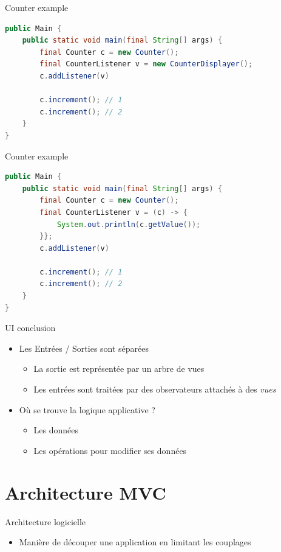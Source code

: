 \documentclass[xcolor=table]{beamer}
\begin{document}
\begin{frame}[fragile]{Counter example}
\begin{lstlisting}[language=Java]
public Main {
    public static void main(final String[] args) {
        final Counter c = new Counter();
        final CounterListener v = new CounterDisplayer();
        c.addListener(v)
        
        c.increment(); // 1
        c.increment(); // 2
    }
}
\end{lstlisting}
\end{frame}

\begin{frame}[fragile]{Counter example}
\begin{lstlisting}[language=Java]
public Main {
    public static void main(final String[] args) {
        final Counter c = new Counter();
        final CounterListener v = (c) -> {
            System.out.println(c.getValue());
        }};
        c.addListener(v)
        
        c.increment(); // 1
        c.increment(); // 2
    }
}
\end{lstlisting}
\end{frame}

\begin{frame}{UI conclusion}
\begin{itemize}
    \item Les Entrées / Sorties sont séparées
    \begin{itemize}
        \item La sortie est représentée par un arbre de vues
        \item Les entrées sont traitées par des observateurs attachés à des \emph{vues}
    \end{itemize}
    \item Où se trouve la logique applicative ?
    \begin{itemize}
        \item Les données
        \item Les opérations pour modifier ses données
    \end{itemize}
\end{itemize}
\end{frame}


\section{Architecture MVC}


\begin{frame}{Architecture logicielle}
\begin{itemize}
    \item Manière de découper une application en limitant les couplages
\end{itemize}
\end{frame}
\end{document}
